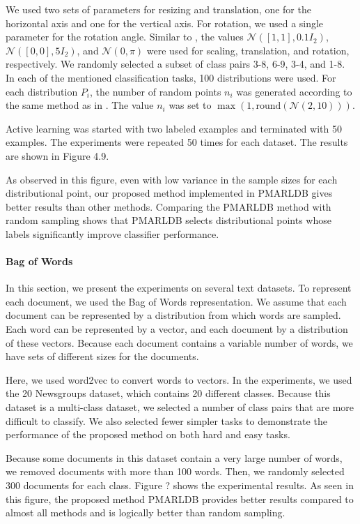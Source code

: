 	We used two sets of parameters for resizing and translation, one for the horizontal axis and one for the vertical axis. For rotation, we used a single parameter for the rotation angle. Similar to \cite{sriperumbudur2009kernel}, the values $\mathcal{N}([1, 1], 0.1 I_2)$, $\mathcal{N}([0, 0], 5 I_2)$, and $\mathcal{N}(0, \pi)$ were used for scaling, translation, and rotation, respectively. We randomly selected a subset of class pairs 3-8, 6-9, 3-4, and 1-8. In each of the mentioned classification tasks, 100 distributions were used. For each distribution $P_i$, the number of random points $n_i$ was generated according to the same method as in \cite{sriperumbudur2009kernel}. The value $n_i$ was set to $\max(1, \text{round}(\mathcal{N}(2, 10)))$.
	
	Active learning was started with two labeled examples and terminated with 50 examples. The experiments were repeated 50 times for each dataset. The results are shown in Figure 4.9.
	
	As observed in this figure, even with low variance in the sample sizes for each distributional point, our proposed method implemented in PMARLDB gives better results than other methods. Comparing the PMARLDB method with random sampling shows that PMARLDB selects distributional points whose labels significantly improve classifier performance.
	
	\paragraph{Bag of Words}
	In this section, we present the experiments on several text datasets. To represent each document, we used the Bag of Words representation. We assume that each document can be represented by a distribution from which words are sampled. Each word can be represented by a vector, and each document by a distribution of these vectors. Because each document contains a variable number of words, we have sets of different sizes for the documents.
	
	Here, we used word2vec \cite{mikolov2013distributed} to convert words to vectors. In the experiments, we used the 20 Newsgroups dataset, which contains 20 different classes. Because this dataset is a multi-class dataset, we selected a number of class pairs that are more difficult to classify. We also selected fewer simpler tasks to demonstrate the performance of the proposed method on both hard and easy tasks.
	
	Because some documents in this dataset contain a very large number of words, we removed documents with more than 100 words. Then, we randomly selected 300 documents for each class. Figure ? shows the experimental results. As seen in this figure, the proposed method PMARLDB provides better results compared to almost all methods and is logically better than random sampling.
	
